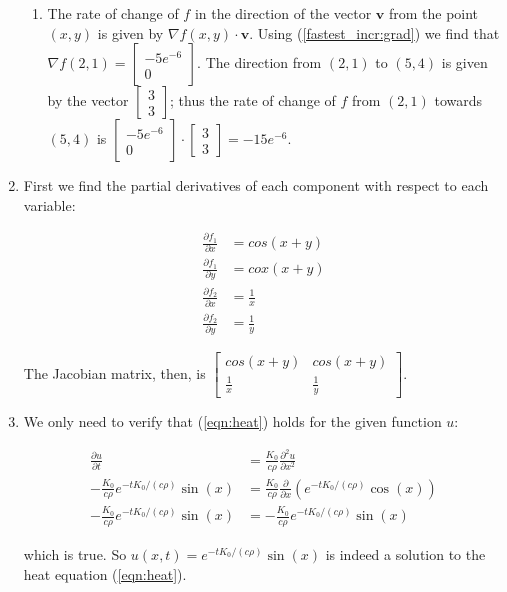 \documentclass{article}
\begin{document}
\begin{enumerate}
\begin{enumerate}
 \item The rate of change of $f$ in the direction of the vector $\mathbf{v}$
  from the point $(x, y)$ is given by $\nabla f(x,y) \cdot \mathbf{v}$.  Using
  (\ref{fastest_incr:grad}) we find that $\nabla f(2, 1) =
  \begin{bmatrix} -5e^{-6} \\ 0 \end{bmatrix}$.  The direction from $(2, 1)$
  to $(5, 4)$ is given by the vector $\begin{bmatrix} 3 \\ 3 \end{bmatrix}$;
  thus the rate of change of $f$ from $(2, 1)$ towards $(5, 4)$ is
  $\begin{bmatrix} -5e^{-6} \\ 0 \end{bmatrix} \cdot
   \begin{bmatrix} 3 \\ 3 \end{bmatrix} = -15e^{-6}$.

 \end{enumerate}

\item

First we find the partial derivatives of each component with respect to each
variable:

 \begin{align*}
  \frac{\partial f_1}{\partial x} &= cos(x + y) \\
  \frac{\partial f_1}{\partial y} &= cox(x + y) \\
  \frac{\partial f_2}{\partial x} &= \frac{1}{x} \\
  \frac{\partial f_2}{\partial y} &= \frac{1}{y}
 \end{align*}

The Jacobian matrix, then, is
$\begin{bmatrix}
 cos(x + y) & cos(x + y) \\ \frac{1}{x} & \frac{1}{y}
\end{bmatrix}$.

\item

We only need to verify that (\ref{eqn:heat}) holds for the given function $u$:

\begin{align*}
 \frac{\partial u}{\partial t} &= \frac{K_0}{c\rho} \frac{\partial^2 u}{\partial x^2} \\
 -\frac{K_0}{c\rho}e^{-tK_0/(c\rho)}\sin(x) &=
 \frac{K_0}{c\rho}\frac{\partial}{\partial x}(e^{-tK_0/(c\rho)}\cos(x)) \\
 -\frac{K_0}{c\rho}e^{-tK_0/(c\rho)}\sin(x) &=
 -\frac{K_0}{c\rho}e^{-tK_0/(c\rho)}\sin(x)
\end{align*}

which is true.  So $u(x,t) = e^{-tK_0/(c\rho)}\sin(x)$ is indeed a solution
to the heat equation (\ref{eqn:heat}).

\end{enumerate}
\end{document}
